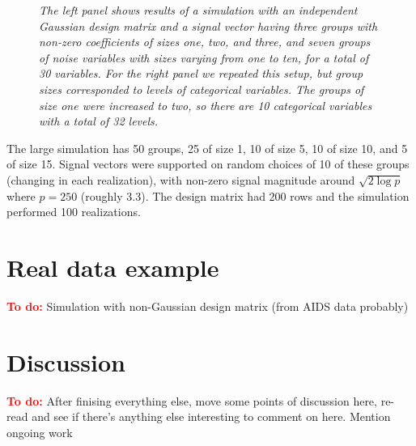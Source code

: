 \documentclass{imsart}
\newcommand{\todo}{\textcolor{red}{\textbf{To do: }}}
\begin{document}


\begin{figure}
\begin{center}
\hspace{-15pt}
\caption{\small \it The left panel shows results of a simulation with
  an independent Gaussian design matrix and a signal vector having
  three groups with non-zero coefficients of sizes one, two, and
  three, and seven groups of noise variables with sizes varying from
  one to ten, for a total of 30 variables. For the right panel we
  repeated this setup, but group sizes corresponded to levels of
  categorical variables. The groups of size one were increased to two,
so there are 10 categorical variables with a total of 32 levels.}
\end{center}
\end{figure}



The large simulation has 50 groups, 25 of size 1, 10 of size 5, 10 of
size 10, and 5 of size 15. Signal vectors were supported on random
choices of 10 of these groups (changing in each realization), with
non-zero signal magnitude around $\sqrt{2\log p}$ where $p = 250$
(roughly 3.3). The design matrix had 200 rows and the simulation
performed 100 realizations.



\section{Real data example}
\todo Simulation with non-Gaussian design matrix (from AIDS data probably)



\section{Discussion}
\label{sec:discuss}

\todo After finising everything else, move some points of discussion
here, re-read and see if there's anything else interesting to comment
on here. Mention ongoing work
\end{document}
